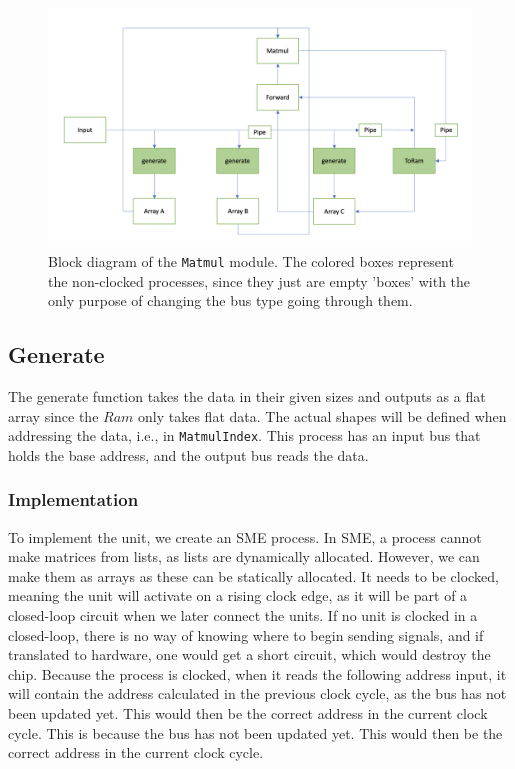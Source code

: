 \begin{figure}
  \centering
  \includegraphics[width=1\linewidth]{Pictures/mm_block_old.png}
  \caption{Block diagram of the \texttt{Matmul} module. The colored boxes represent the non-clocked processes, since they just are empty 'boxes' with the only purpose of changing the bus type going through them.}
  \label{fig:mm_block_old}
\end{figure}

\subsection{Generate}
The generate function takes the data in their given sizes and outputs as a flat array since the $Ram$ only takes flat data. The actual shapes will be defined when addressing the data, i.e., in \texttt{MatmulIndex}. 
This process has an input bus that holds the base address, and the output bus reads the data.

\subsubsection{Implementation}
To implement the unit, we create an SME process. 
In SME, a process cannot make matrices from lists, as lists are dynamically allocated. However, we can make them as arrays as these can be statically allocated. It needs to be clocked, meaning the unit will activate on a rising clock edge, as it will be part of a closed-loop circuit when we later connect the units. If no unit is clocked in a closed-loop, there is no way of knowing where to begin sending signals, and if translated to hardware, one would get a short circuit, which would destroy the chip.
Because the process is clocked, when it reads the following address input, it will contain the address calculated in the previous clock cycle, as the bus has not been updated yet. This would then be the correct address in the current clock cycle.
This is because the bus has not been updated yet. This would then be the correct address in the current clock cycle. 


